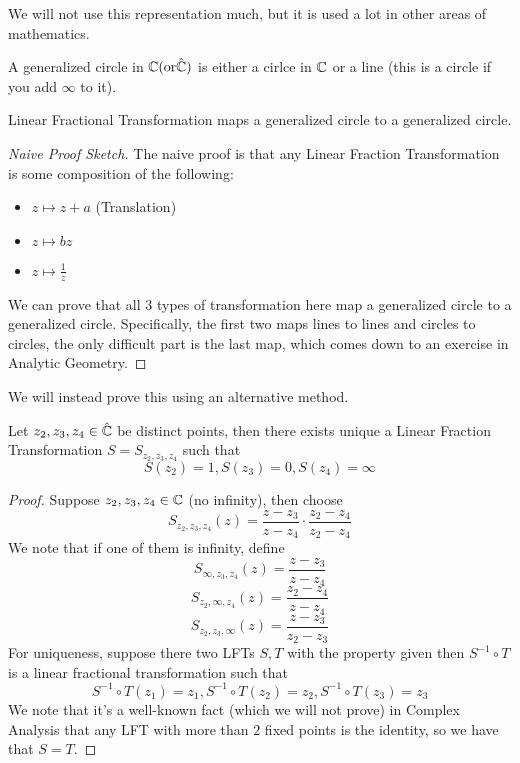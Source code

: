 We will not use this representation much, but it is used a lot in other areas of mathematics.

\begin{definition}
    A generalized circle in $\mathbb{C} (\text{or} \hat{\mathbb{C}})$ is either a cirlce in $\mathbb{C}$ or a line (this is a circle if you add $\infty$ to it).
\end{definition}

\begin{theorem}\label{thm::lft-circle}
    Linear Fractional Transformation maps a generalized circle to a generalized circle.
\end{theorem}

\begin{proof}[Naive Proof Sketch]
    The naive proof is that any Linear Fraction Transformation is some composition of the following:
    \begin{itemize}
        \item $z \mapsto z + a$ (Translation)
        \item $z \mapsto bz$
        \item $z \mapsto \frac{1}{z}$
    \end{itemize}
    We can prove that all $3$ types of transformation here map a generalized circle to a generalized circle. Specifically, the first two maps lines to lines and circles to circles, the only difficult part is the last map, which comes down to an exercise in Analytic Geometry.
\end{proof}

We will instead prove this using an alternative method.

\begin{proposition}
        Let $z_2, z_3, z_4 \in \hat{\mathbb{C}}$ be distinct points, then there exists unique a Linear Fraction Transformation $S = S_{z_2, z_3, z_4}$ such that
        \[S(z_2) = 1, S(z_3) = 0, S(z_4) = \infty\]
\end{proposition}

\begin{proof}
    Suppose $z_2, z_3, z_4 \in \mathbb{C}$ (no infinity), then choose
    \[S_{z_2, z_3, z_4}(z) = \frac{z - z_3}{z - z_4} \cdot \frac{z_2 - z_4}{z_2 - z_4}\]
    We note that if one of them is infinity, define
    \[S_{\infty, z_3, z_4}(z) = \frac{z - z_3}{z - z_4}\]
    \[S_{z_2, \infty, z_4}(z) = \frac{z_2 - z_4}{z - z_4}\]
    \[S_{z_2, z_3, \infty}(z) = \frac{z - z_3}{z_2 - z_3}\]
    For uniqueness, suppose there two LFTs $S, T$ with the property given then $S^{-1} \circ T$ is a linear fractional transformation such that
    \[S^{-1} \circ T(z_1) = z_1, S^{-1} \circ T(z_2) = z_2, S^{-1} \circ T(z_3) = z_3\]
    We note that it's a well-known fact (which we will not prove) in Complex Analysis that any LFT with more than $2$ fixed points is the identity, so we have that $S = T$.
\end{proof}

